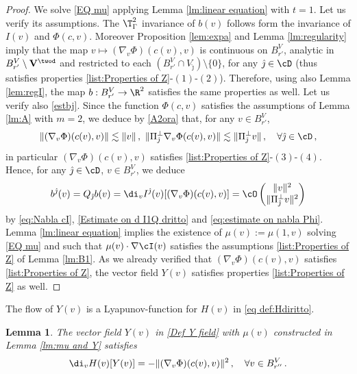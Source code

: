 \documentclass[11pt,a4paper,reqno]{article}
\numberwithin{equation}{section}
\newtheorem{lemma}[theorem]{Lemma}
\theoremstyle{definition}
\begin{document}
\begin{proof}
We solve \eqref{EQ mu} applying Lemma \ref{lm:linear equation} with $ t = 1 $.
    Let us verify 
    its assumptions. The $\T^2_\Gamma $ invariance of $ b(v) $ follows 
    form the invariance of $ I (v) $ and $ \Phi (c, v) $. Moreover  
    Proposition \ref{lem:expa} and Lemma  \ref{lm:regularity} imply that the map $v\mapsto (\nabla_v\Phi) (c(v),v)$ is continuous on $B_{r'}^V$, analytic in $B_{r'}^V\setminus {\bf V}^{\twod}$ and restricted to each $(B_{r'}^V\cap V_{\hat \jmath})\setminus\{0\}$, for any $ {\hat \jmath} \in \cD $
    (thus  satisfies properties \eqref{list:Properties of Z}-$(1)$-$(2)$).   
    Therefore, using also Lemma \ref{lem:regI}, the map 
    $ b:B_{r'}^V\to \R^2$ satisfies the same properties as well. Let us verify also \eqref{estbj}. Since the function $ \Phi(c,v) $ satisfies the assumptions of Lemma 
    \ref{lm:A} with $ m = 2 $, we deduce by 
    \eqref{A2ora} that, 
     for any $v\in B_{r'}^V$, \begin{equation}\label{eq:estimate on nabla Phi}
    \|(\nabla_v\Phi)(c(v),v)\|\lesssim \|v\|\, , \ \|\Pi_{\hat \jmath}^\bot\nabla_v\Phi(c(v),v)\|\lesssim \|\Pi_{\hat \jmath}^\bot v\|\, ,  \quad \forall  {\hat \jmath}\in \cD \, , 
    \end{equation}
   in particular  $ (\nabla_v\Phi) (c(v),v)$ satisfies \eqref{list:Properties of Z}-$(3)$-$(4)$.
    Hence, for any $  {\hat \jmath}\in \cD $, $ v\in B_{r'}^V $, we deduce
    $$ 
    b^{\hat \jmath}(v) = 
    Q_{\hat \jmath} b(v) 
    =
    \di_v I^{\hat \jmath}(v)[(\nabla_v\Phi)(c(v),v)] =\cO\begin{pmatrix}
                \|v\|^2\\
                \|\Pi_{\hat \jmath}^\bot v\|^2
            \end{pmatrix} 
    $$
    by \eqref{eq:Nabla cI}, \eqref{Estimate on d I1Q dritto} and \eqref{eq:estimate on nabla Phi}.
    Lemma \ref{lm:linear equation} implies the existence  of  $\mu(v):=\mu(1,v)$ solving \eqref{EQ mu} and such that $\mu(v)\cdot \nabla \cI(v)$ satisfies the assumptions \eqref{list:Properties of Z} of Lemma \ref{lm:B1}.
    As we already verified that $(\nabla_v\Phi)(c(v),v)$ satisfies {\eqref{list:Properties of Z}}, the vector field $Y(v)$ satisfies properties \eqref{list:Properties of Z} as well. 
\end{proof}

The flow of $ Y(v)  $ is a  Lyapunov-function for $ H(v) $ in \eqref{eq def:Hdiritto}.  

\begin{lemma}
    The vector field $Y(v)$ in \eqref{Def Y field} with $\mu(v)$ constructed in Lemma \ref{lm:mu and Y}
   satisfies
    \begin{equation}\label{X H decreases 2}
        \di_v H(v)[Y(v)]=- \|(\nabla_v \Phi)(c(v),v)\|^2\, ,
        \quad \forall v\in B_{r''}^V \, . 
    \end{equation}
\end{lemma}
\end{document}
